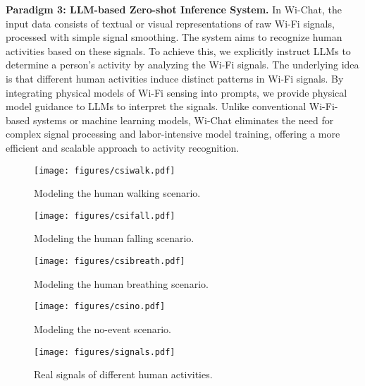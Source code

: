 \textbf{Paradigm 3: LLM-based Zero-shot Inference System.} In Wi-Chat, the input data consists of textual or visual representations of raw Wi-Fi signals, processed with simple signal smoothing. The system aims to recognize human activities based on these signals.
To achieve this, we explicitly instruct LLMs to determine a person's activity by analyzing the Wi-Fi signals. The underlying idea is that different human activities induce distinct patterns in Wi-Fi signals. By integrating physical models of Wi-Fi sensing into prompts, we provide physical model guidance to LLMs to interpret the signals.
Unlike conventional Wi-Fi-based systems or machine learning models, Wi-Chat eliminates the need for complex signal processing and labor-intensive model training, offering a more efficient and scalable approach to activity recognition.

\begin{figure}[t]
    \centering
    \texttt{[image: figures/csiwalk.pdf]}
    \vspace{-3mm}
    \caption{Modeling the human walking scenario.}
    \vspace{-4mm}
    \label{csiwalk}
\end{figure}

\begin{figure}[t]
    \centering
    \texttt{[image: figures/csifall.pdf]}
    \vspace{-3mm}
    \caption{Modeling the human falling scenario.}
    \vspace{-7mm}
    \label{csifall}
\end{figure}

\begin{figure}[t]
    \centering
    \texttt{[image: figures/csibreath.pdf]}
    \vspace{-3mm}
    \caption{Modeling the human breathing scenario.}
    \vspace{-4mm}
    \label{csibreath}
\end{figure}

\begin{figure}[t]
    \centering
    \texttt{[image: figures/csino.pdf]}
    \vspace{-3mm}
    \caption{Modeling the no-event scenario.}
    \vspace{-7mm}
    \label{csino}
\end{figure}



\begin{figure*}[h]
    \centering
    \texttt{[image: figures/signals.pdf]}
    \caption{Real signals of different human activities.}
    \label{signals}
\end{figure*}

